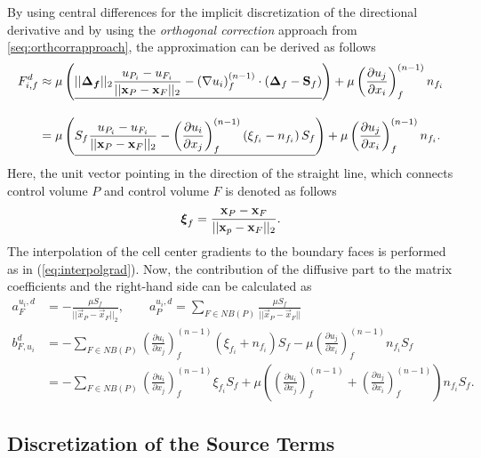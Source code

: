 By using central differences for the implicit discretization of the directional derivative and by using the \emph{orthogonal correction} approach from \ref{seq:orthcorrapproach}, the approximation can be derived as follows
\begin{align*}
  F_{i,f}^d 
  &\approx 
  \mu \left( \underline{||\boldsymbol{\boldsymbol{\Delta}_f}||_2 \frac{u_{P_i} - u_{F_i}}{ || \mathbf{x}_P - \mathbf{x}_F ||_2 }  
  -  \left(\nabla u_i \right)_f^{(n-1)} \cdot \left(\boldsymbol{\Delta}_f - \mathbf{S}_f\right)  }  \right)
  + \mu \left( \frac{\partial u_j}{\partial x_i} \right)_f^{(n-1)} n_{f_i} \\[1em]
  &= \mu \left(\underline{  S_f \frac{u_{P_i} - u_{F_i}}{ || \mathbf{x}_P - \mathbf{x}_F ||_2 }  
  - \left( \frac{\partial u_i}{\partial x_j}\right)_f^{(n-1)} \left(\xi_{f_i} - n_{f_i}\right)S_f  } \right)
  + \mu \left( \frac{\partial u_j}{\partial x_i} \right)_f^{(n-1)} n_{f_i}.
\end{align*}
Here, the unit vector pointing in the direction of the straight line, which connects control volume \(P\) and control volume \(F\) is denoted as follows
\begin{displaymath}
  \boldsymbol{\xi}_f = \frac{\mathbf{x}_P - \mathbf{x}_F}{|| \mathbf{x}_p - \mathbf{x}_F ||_2}.
\end{displaymath}
The interpolation of the cell center gradients to the boundary faces is performed as in (\ref{eq:interpolgrad}). Now, the contribution of the diffusive part to the matrix coefficients and the right-hand side can be calculated as
\begin{align*}
  a_F^{u_i,d} &= - \frac{\mu S_f}{||\vec{x}_P - \vec{x}_F||_2}, 
  \quad \quad a_P^{u_i,d} = \sum_{F \in NB(P)} \frac{\mu S_f}{|| \vec{x}_P - \vec{x}_F ||} \\[1em]
  b_{F,u_i}^d &=  - \sum_{F \in NB(P)} \left( \frac{\partial u_i}{\partial x_j}\right)_f^{(n-1)} \left(\xi_{f_i} + n_{f_i}\right)S_f  
  - \mu \left( \frac{\partial u_j}{\partial x_i} \right)_f^{(n-1)} n_{f_i} S_f   \nonumber \\[0.5em]
  &=  - \sum_{F \in NB(P)} \left( \frac{\partial u_i}{\partial x_j}\right)_f^{(n-1)} \xi_{f_i} S_f
  + \mu \left( \left( \frac{\partial u_i}{\partial x_j} \right)_f^{(n-1)}
  + \left( \frac{\partial u_j}{\partial x_i} \right)_f^{(n-1)} \right) n_{f_i} S_f.
\end{align*}

\subsection{Discretization of the Source Terms}

